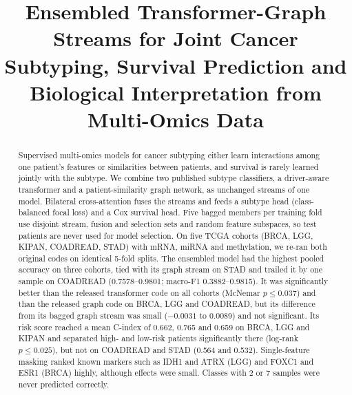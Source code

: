 \documentclass[conference]{IEEEtran}
\begin{document}
\title{Ensembled Transformer-Graph Streams for Joint Cancer Subtyping, Survival Prediction and Biological
Interpretation from Multi-Omics Data}

\author{
\and
{}
}

\maketitle

\begin{abstract}
Supervised multi-omics models for cancer subtyping either learn interactions among one patient's features or
similarities between patients, and survival is rarely learned jointly with the subtype. We combine two
published subtype classifiers, a driver-aware transformer and a patient-similarity graph network, as unchanged streams
of one model. Bilateral cross-attention fuses the streams and feeds a subtype head (class-balanced focal loss) and a
Cox survival head. Five bagged members per training fold use disjoint stream, fusion and selection sets and random
feature subspaces, so test patients are never used for model selection. On five TCGA cohorts (BRCA, LGG, KIPAN,
COADREAD, STAD) with mRNA, miRNA and methylation, we re-ran both original codes on identical 5-fold
splits. The ensembled model had the highest pooled accuracy on three cohorts, tied with its graph stream on STAD and
trailed it by one sample on COADREAD (0.7578--0.9801; macro-F1 0.3882--0.9815).
It was significantly better than the released transformer code on all cohorts (McNemar $p\le0.037$) and than the
released graph code on BRCA, LGG and COADREAD, but its difference from its bagged graph stream was small
($-0.0031$ to 0.0089) and not significant. Its risk score reached a mean C-index of 0.662, 0.765 and 0.659 on BRCA, LGG
and KIPAN and separated high- and low-risk patients significantly there (log-rank $p\le0.025$), but not on COADREAD and
STAD (0.564 and 0.532). Single-feature masking ranked known markers such as IDH1 and ATRX (LGG) and FOXC1 and ESR1
(BRCA) highly, although effects were small. Classes with 2 or 7 samples were never predicted
correctly.
\end{abstract}
\end{document}
